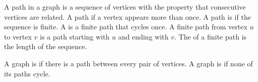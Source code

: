 
A path in a graph is a sequence of
vertices with the property that
consecutive vertices are related.
A path  if a vertex
appears more than once.
A path is  if the
sequence is finite.
A  is a finite path
that cycles once.
A finite path from vertex $u$ to vertex $v$
is a path starting with $u$ and
ending with $v$.
The  of a finite path is
the length of the sequence.


A graph is 
if there is a path between every pair
of vertices. A graph is
 if none of its
paths cycle.


\strats
